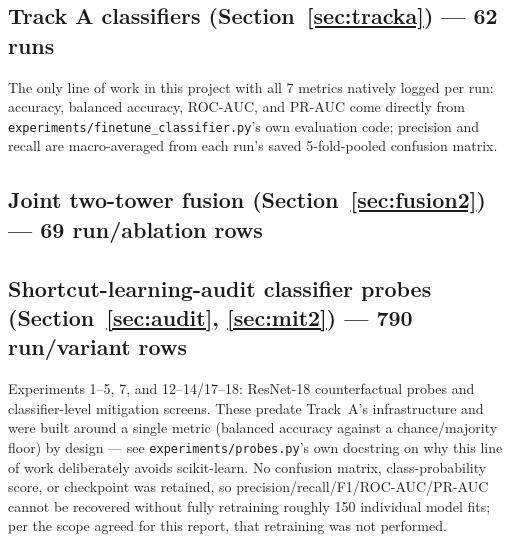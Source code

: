 \documentclass[10pt]{article}
\begin{document}
\subsection{Track A classifiers (Section~\ref{sec:tracka}) --- 62 runs}

The only line of work in this project with all 7 metrics natively logged per run: accuracy, balanced
accuracy, ROC-AUC, and PR-AUC come directly from \texttt{experiments/finetune\_classifier.py}'s own
evaluation code; precision and recall are macro-averaged from each run's saved 5-fold-pooled confusion
matrix.



\subsection{Joint two-tower fusion (Section~\ref{sec:fusion2}) --- 69 run/ablation rows}



\subsection{Shortcut-learning-audit classifier probes (Section~\ref{sec:audit}, \ref{sec:mit2}) --- 790 run/variant rows}

Experiments 1--5, 7, and 12--14/17--18: ResNet-18 counterfactual probes and classifier-level mitigation
screens. These predate Track~A's infrastructure and were built around a single metric (balanced accuracy
against a chance/majority floor) by design --- see \texttt{experiments/probes.py}'s own docstring on why
this line of work deliberately avoids scikit-learn. No confusion matrix, class-probability score, or
checkpoint was retained, so precision/recall/F1/ROC-AUC/PR-AUC cannot be recovered without fully retraining
roughly 150 individual model fits; per the scope agreed for this report, that retraining was not performed.


\end{document}
